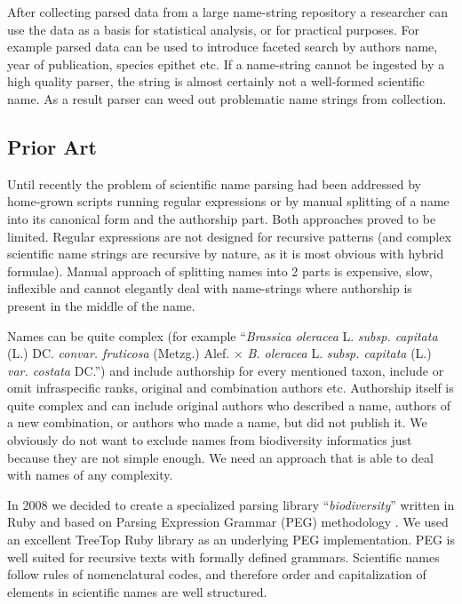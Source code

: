 \documentclass{bmcart}
\begin{document}
After collecting parsed data from a large name-string repository a researcher
can use the data as a basis for statistical analysis, or for practical
purposes. For example parsed data can be used to introduce faceted search by
authors name, year of publication, species epithet etc. If a name-string cannot
be ingested by a high quality parser, the string is almost certainly not a
well-formed scientific name. As a result parser can weed out problematic name
strings from collection.

\subsection*{Prior Art}

Until recently the problem of scientific name parsing had been addressed by
home-grown scripts running regular expressions or by manual splitting of a name
into its canonical form and the authorship part. Both approaches proved to be
limited. Regular expressions are not designed for recursive patterns (and
complex scientific name strings are recursive by nature, as it is most obvious
with hybrid formulae). Manual approach of splitting names into 2 parts is
expensive, slow, inflexible and cannot elegantly deal with name-strings where
authorship is present in the middle of the name.

Names can be quite complex (for example ``\textit{Brassica oleracea} L.
\textit{subsp.  capitata} (L.) DC. \textit{convar. fruticosa} (Metzg.) Alef.
$\times$ \textit{B. oleracea} L.  \textit{subsp. capitata} (L.) \textit{var.
costata} DC.'')  and include authorship for every mentioned taxon, include or
omit infraspecific ranks, original and combination authors etc. Authorship
itself is quite complex and can include original authors who described a name,
authors of a new combination, or authors who made a name, but did not publish
it. We obviously do not want to exclude names from biodiversity informatics
just because they are not simple enough. We need an approach that is able to
deal with names of any complexity.

In 2008 we decided to create a specialized parsing library
``\textit{biodiversity}'' \cite{biodiversity} written in Ruby and based on
Parsing Expression Grammar (PEG) methodology \cite{Ford2004}. We used an
excellent TreeTop Ruby library \cite{treetop} as an underlying PEG
implementation. PEG is well suited for recursive texts with formally defined
grammars. Scientific names follow rules of nomenclatural codes, and therefore
order and capitalization of elements in scientific names are well structured.
\end{document}
